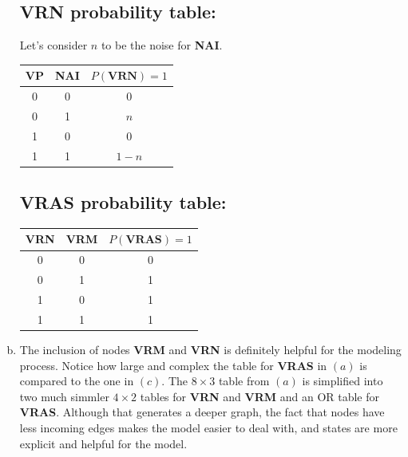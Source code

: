\documentclass{article}
\begin{document}
\begin{enumerate}[(a)]
                \subsection*{VRN probability table:}
                    Let's consider $n$ to be the noise for \textbf{NAI}.
                    \begin{center}
                       \begin{tabular}{|c|c|c|} \hline
                            \textbf{VP} & \textbf{NAI} & \textbf{$P(\textbf{VRN})=1$} \\ \hline
                            0 & 0 & 0\\ \hline
                            0 & 1 & $n$ \\ \hline
                            1 & 0 & 0 \\ \hline
                            1 & 1 & $1-n$\\ \hline      
                        \end{tabular}
                    \end{center}

                \subsection*{VRAS probability table:}
                    \begin{center}
                       \begin{tabular}{|c|c|c|} \hline
                            \textbf{VRN} & \textbf{VRM} & \textbf{$P(\textbf{VRAS})=1$} \\ \hline
                            0 & 0 & 0\\ \hline
                            0 & 1 & 1 \\ \hline
                            1 & 0 & 1 \\ \hline
                            1 & 1 & 1\\ \hline
                        \end{tabular}
                    \end{center}


            \item
                The inclusion of nodes \textbf{VRM} and \textbf{VRN} is definitely helpful for the modeling process. Notice how large and complex the table for \textbf{VRAS} in $(a)$ is compared to the one in $(c)$. The $8\times3$ table from $(a)$ is simplified into two much simmler $4\times2$ tables for \textbf{VRN} and \textbf{VRM} and an OR table for \textbf{VRAS}. Although that generates a deeper graph, the fact that nodes have less incoming edges makes the model easier to deal with, and states are more explicit and helpful for the model.
        \end{enumerate}
\end{document}
